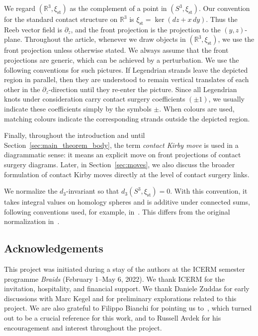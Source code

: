 \documentclass{amsart}
\numberwithin{equation}{section}
\numberwithin{figure}{section}
\theoremstyle{definition}
\theoremstyle{remark}
\newcommand{\R}{\mathbb{R}}
\let\olddxi\xi %
\renewcommand{\xi}{\olddxi}
\newcommand{\xist}{\olddxi_{\mathrm{st}}}
\begin{document}
We regard \((\R^3,\xist)\) as the complement of a point in \((S^3,\xist)\). Our convention for the standard contact structure on \(\R^3\) is $\xist=\ker(dz+x\,dy)$. Thus the Reeb vector field is \(\partial_z\), and the front projection is the projection to the \((y,z)\)-plane. Throughout the article, whenever we draw objects in $(\R^3,\xist)$, we use the front projection unless otherwise stated. We always assume that the front projections are generic, which can be achieved by a perturbation. We use the following conventions for such pictures. If Legendrian strands leave the depicted region in parallel, then they are understood to remain vertical translates of each other in the $\partial_z$-direction until they re-enter the picture. Since all Legendrian knots under consideration carry contact surgery coefficients $(\pm1)$, we usually indicate these coefficients simply by the symbols $\pm$. When colours are used, matching colours indicate the corresponding strands outside the depicted region.

Finally, throughout the introduction and until Section~\ref{sec:main_theorem_body}, the term \emph{contact Kirby move} is used in a diagrammatic sense: it means an explicit move on front projections of contact surgery diagrams. Later, in Section~\ref{sec:moves}, we also discuss the broader formulation of contact Kirby moves directly at the level of contact surgery links.

We normalize the $d_3$-invariant so that $d_3(S^3,\xist)=0$. With this convention, it takes integral values on homology spheres and is additive under connected sums, following conventions used, for example, in~\cite{Casals_Etnyre_Kegel,Etnyre_Kegel_Onaran,Kegel_Onaran}. This differs from the original normalization in~\cite{Gompf,Ding_Geiges_Stipsicz}.

\subsection*{Acknowledgements}
This project was initiated during a stay of the authors at the ICERM semester programme \textit{Braids} (February 1--May 6, 2022). We thank ICERM for the invitation, hospitality, and financial support. We thank Daniele Zuddas for early discussions with Marc Kegel and for preliminary explorations related to this project. We are also grateful to Filippo Bianchi for pointing us to~\cite{Gervais}, which turned out to be a crucial reference for this work, and to Russell Avdek for his encouragement and interest throughout the project.
\end{document}
